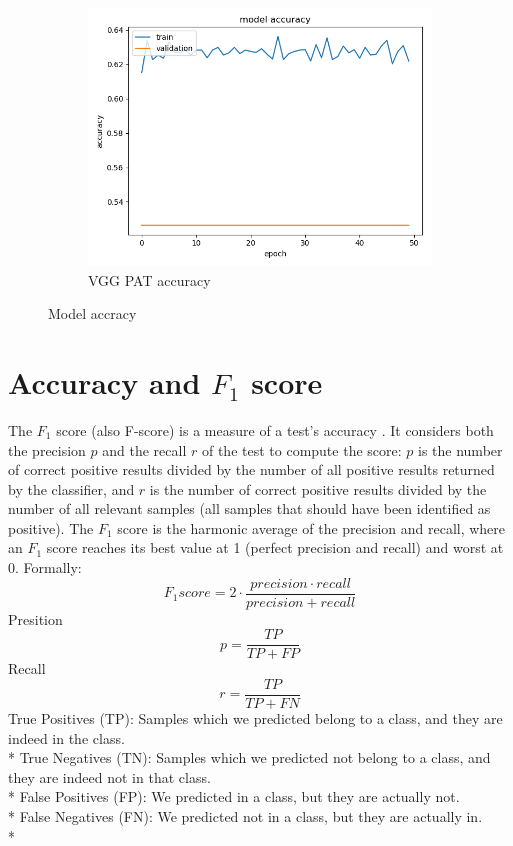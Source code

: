 \begin{figure}[h!]
\begin{subfigure}[b]{.3\linewidth}
\includegraphics[width=\linewidth]{Figs/vgg_pat_acc.jpg}
\caption{VGG PAT accuracy}
\end{subfigure}
\caption{Model accracy}
\label{fig:acc}
\end{figure}


\section{Accuracy and $F_1$ score}
The $F_1$ score (also F-score) is a measure of a test's accuracy \citep{powers2011evaluation}. It considers both the precision $p$ and the recall $r$ of the test to compute the score: $p$ is the number of correct positive results divided by the number of all positive results returned by the classifier, and $r$ is the number of correct positive results divided by the number of all relevant samples (all samples that should have been identified as positive). The $F_1$ score is the harmonic average of the precision and recall, where an $F_1$ score reaches its best value at 1 (perfect precision and recall) and worst at 0.
Formally: $$F_1 score = 2 \cdot \frac{precision \cdot recall}{precision + recall}$$
Presition $$p = \frac{TP}{TP + FP}$$
Recall $$r = \frac{TP}{TP + FN}$$
True Positives (TP): Samples which we predicted belong to a class, and they are indeed in the class.\\*
True Negatives (TN): Samples which we predicted not belong to a class, and they are indeed not in that class.\\*
False Positives (FP): We predicted in a class, but they are actually not.\\*
False Negatives (FN): We predicted not in a class, but they are actually in.\\*

